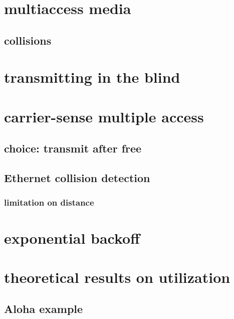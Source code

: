 \section{multiaccess media}



\subsection{collisions}


\section{transmitting in the blind}


\section{carrier-sense multiple access}


\subsection{choice: transmit after free}

\subsection{Ethernet collision detection}

\subsubsection{limitation on distance}

\section{exponential backoff}

\section{theoretical results on utilization}

\subsection{Aloha example}


